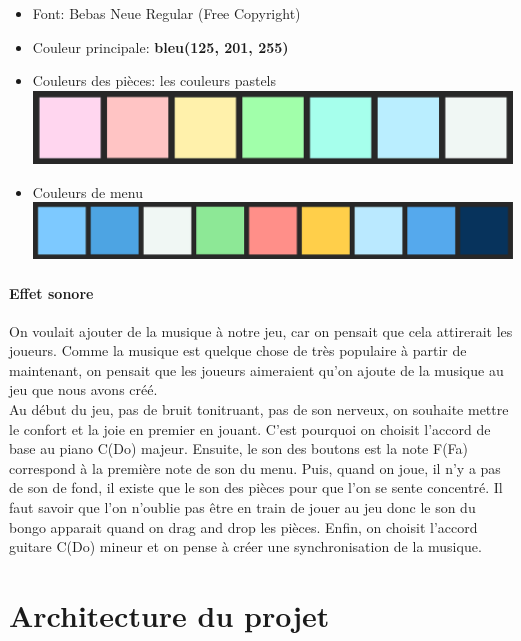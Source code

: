 \documentclass[a4paper]{report}
\begin{document}
\begin{itemize} 
    \item Font: Bebas Neue Regular (Free Copyright)
    \item Couleur principale: \textbf{bleu(125, 201, 255)}
    \item Couleurs des pièces: les couleurs pastels\\
        \includegraphics[scale=0.2]{images/palette1.png}
    \item Couleurs de menu\\
        \includegraphics[scale=0.2]{images/palette2.png}
\end{itemize}

\subsection{Effet sonore}
On voulait ajouter de la musique à notre jeu, car on pensait que cela attirerait les joueurs. 
Comme la musique est quelque chose de très populaire à partir de maintenant, on pensait que les 
joueurs aimeraient qu'on ajoute de la musique au jeu que nous avons créé.\\

Au début du jeu, pas de bruit tonitruant, pas de son nerveux, on souhaite mettre le confort et la joie en premier en jouant. C'est pourquoi on choisit l'accord de base au piano C(Do) majeur.
Ensuite, le son des boutons est la note F(Fa) correspond à la première note de son du menu.
Puis, quand on joue, il n'y a pas de son de fond, il existe que le son des pièces pour que l'on se sente concentré. Il faut savoir que l'on n'oublie pas être en train de jouer au jeu donc le son du bongo apparait quand on drag and drop les pièces.
Enfin, on choisit l'accord guitare C(Do) mineur et on pense à créer une synchronisation de la musique.

\part{Architecture du projet}
\end{document}
